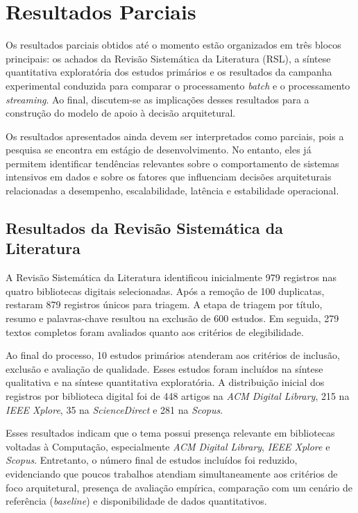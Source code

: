 \chapter{Resultados Parciais}
\label{cap:resultados}

Os resultados parciais obtidos até o momento estão organizados em três blocos principais: os achados da Revisão Sistemática da Literatura (RSL), a síntese quantitativa exploratória dos estudos primários e os resultados da campanha experimental conduzida para comparar o processamento \textit{batch} e o processamento \textit{streaming}. Ao final, discutem-se as implicações desses resultados para a construção do modelo de apoio à decisão arquitetural.

Os resultados apresentados ainda devem ser interpretados como parciais, pois a pesquisa se encontra em estágio de desenvolvimento. No entanto, eles já permitem identificar tendências relevantes sobre o comportamento de sistemas intensivos em dados e sobre os fatores que influenciam decisões arquiteturais relacionadas a desempenho, escalabilidade, latência e estabilidade operacional.

\section{Resultados da Revisão Sistemática da Literatura}
\label{sec:resultados-rsl}

A Revisão Sistemática da Literatura identificou inicialmente 979 registros nas quatro bibliotecas digitais selecionadas. Após a remoção de 100 duplicatas, restaram 879 registros únicos para triagem. A etapa de triagem por título, resumo e palavras-chave resultou na exclusão de 600 estudos. Em seguida, 279 textos completos foram avaliados quanto aos critérios de elegibilidade.

Ao final do processo, 10 estudos primários atenderam aos critérios de inclusão, exclusão e avaliação de qualidade. Esses estudos foram incluídos na síntese qualitativa e na síntese quantitativa exploratória. A distribuição inicial dos registros por biblioteca digital foi de 448 artigos na \textit{ACM Digital Library}, 215 na \textit{IEEE Xplore}, 35 na \textit{ScienceDirect} e 281 na \textit{Scopus}.

Esses resultados indicam que o tema possui presença relevante em bibliotecas voltadas à Computação, especialmente \textit{ACM Digital Library}, \textit{IEEE Xplore} e \textit{Scopus}. Entretanto, o número final de estudos incluídos foi reduzido, evidenciando que poucos trabalhos atendiam simultaneamente aos critérios de foco arquitetural, presença de avaliação empírica, comparação com um cenário de referência (\textit{baseline}) e disponibilidade de dados quantitativos.


